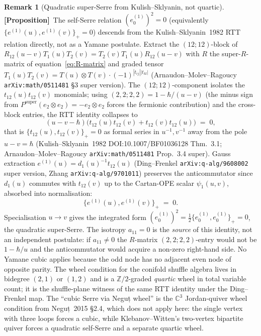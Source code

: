 \documentclass[11pt]{amsart}
\theoremstyle{definition}
\newtheorem{remark}[theorem]{Remark}
\providecommand{\bZ}{\mathbb{Z}}
\providecommand{\bC}{\mathbb{C}}
\providecommand{\ClaimStatusProposition}{\textbf{\textsf{[Proposition]}}}
\begin{document}
\begin{remark}[Quadratic super-Serre from Kulish--Sklyanin, not quartic]
\label{rem:quartic-serre}
\ClaimStatusProposition\
The self-Serre relation $(e^{(1)}_0)^2 = 0$ (equivalently $\{e^{(1)}(u),
e^{(1)}(v)\}_+ = 0$) descends from the Kulish--Sklyanin~1982 RTT relation
directly, not as a Yamane postulate. Extract the $(12; 12)$-block of
$R_{12}(u-v) T_1(u) T_2(v) = T_2(v) T_1(u) R_{12}(u-v)$ with $R$ the
super-$R$-matrix of equation~\eqref{eq:R-matrix} and graded tensor
$T_1(u) T_2(v) = T(u) \otimes T(v) \cdot (-1)^{|t_{ij}||t_{kl}|}$
(Arnaudon--Molev--Ragoucy \texttt{arXiv:math/0511481} §3 super version).
The $(12; 12)$-component isolates the $t_{12}(u) t_{12}(v)$ monomials;
using $(2,2; 2,2) = 1 - \hbar/(u-v)$ (the minus sign from
$P^{\mathrm{super}}(e_2 \otimes e_2) = -e_2 \otimes e_2$ forces the
fermionic contribution) and the cross-block entries, the RTT identity
collapses to
\[
  (u - v - \hbar)\bigl(t_{12}(u) t_{12}(v) + t_{12}(v) t_{12}(u)\bigr)
  \;=\; 0,
\]
that is $\{t_{12}(u), t_{12}(v)\}_+ = 0$ as formal series in $u^{-1},
v^{-1}$ away from the pole $u - v = \hbar$ (Kulish--Sklyanin~1982
DOI:10.1007/BF01036128 Thm.~3.1; Arnaudon--Molev--Ragoucy
\texttt{arXiv:math/0511481} Prop.~3.4 super). Gauss extraction
$e^{(1)}(u) = d_1(u)^{-1} t_{12}(u)$ (Ding--Frenkel
\texttt{arXiv:q-alg/9608002} super version, Zhang
\texttt{arXiv:q-alg/9701011}) preserves the anticommutator since
$d_1(u)$ commutes with $t_{12}(v)$ up to the Cartan-OPE scalar
$\psi_1(u, v)$, absorbed into normalisation:
\[
  \{e^{(1)}(u), e^{(1)}(v)\}_+ \;=\; 0.
\]
Specialisation $u \to v$ gives the integrated form $(e^{(1)}_0)^2 =
\tfrac{1}{2}\{e^{(1)}_0, e^{(1)}_0\}_+ = 0$, the quadratic super-Serre.
The isotropy $a_{11} = 0$ is the \emph{source} of this identity, not
an independent postulate: if $a_{11} \neq 0$ the $R$-matrix $(2,2;
2,2)$-entry would not be $1 - \hbar/u$ and the anticommutator would
acquire a non-zero right-hand side. No Yamane cubic applies because
the odd node has no adjacent even node of opposite parity. The wheel
condition for the conifold shuffle algebra lives in bidegree $(2,1)$
or $(1,2)$ and is a $\bZ/2$-graded \emph{quartic} wheel in total
variable count; it is the shuffle-plane witness of the same RTT
identity under the Ding--Frenkel map. The ``cubic Serre via Neguț
wheel'' is the $\bC^3$ Jordan-quiver wheel condition from Neguț~2015
§2.4, which does not apply here: the single vertex with three loops
forces a cubic, while Klebanov--Witten's two-vertex bipartite quiver
forces a quadratic self-Serre and a separate quartic wheel.
\end{remark}
\end{document}
